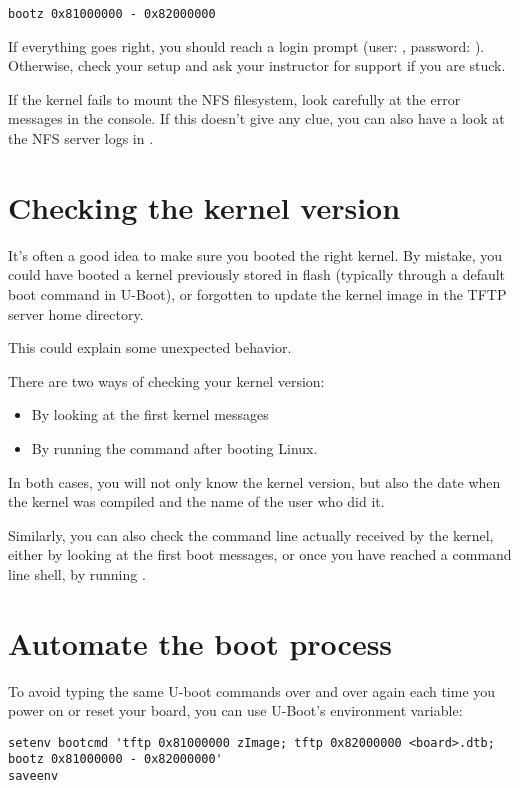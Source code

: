 \begin{verbatim}
bootz 0x81000000 - 0x82000000
\end{verbatim}

If everything goes right, you should reach a login prompt (user:
, password: ). Otherwise, check your setup and
ask your instructor for support if you are stuck.

If the kernel fails to mount the NFS filesystem, look carefully at the
error messages in the console. If this doesn't give any clue, you can
also have a look at the NFS server logs in .

\section{Checking the kernel version}

It's often a good idea to make sure you booted the right kernel.
By mistake, you could have booted a kernel previously stored in flash
(typically through a default boot command in U-Boot), or forgotten to
update the kernel image in the TFTP server home directory.

This could explain some unexpected behavior.

There are two ways of checking your kernel version:
\begin{itemize}
\item By looking at the first kernel messages
\item By running the  command after booting Linux.
\end{itemize}

In both cases, you will not only know the kernel version, but also
the date when the kernel was compiled and the name of the user who
did it.

Similarly, you can also check the command line actually received by
the kernel, either by looking at the first boot messages, or once you
have reached a command line shell, by running .

\section{Automate the boot process}

To avoid typing the same U-boot commands over and over again each time
you power on or reset your board, you can use U-Boot's 
environment variable:

{\scriptsize
\begin{verbatim}
setenv bootcmd 'tftp 0x81000000 zImage; tftp 0x82000000 <board>.dtb; bootz 0x81000000 - 0x82000000'
saveenv
\end{verbatim}
}

